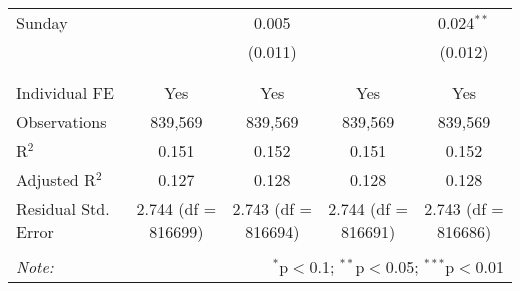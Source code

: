 \documentclass[
]{article}
\begin{document}
\begin{table}[!htbp]
{\begin{tabular}{@{\extracolsep{5pt}}lcccc}
 Sunday &  & 0.005 &  & 0.024$^{**}$ \\ 
  &  & (0.011) &  & (0.012) \\ 
  & & & & \\ 
\hline \\[-1.8ex] 
Individual FE & Yes & Yes & Yes & Yes \\ 
Observations & 839,569 & 839,569 & 839,569 & 839,569 \\ 
R$^{2}$ & 0.151 & 0.152 & 0.151 & 0.152 \\ 
Adjusted R$^{2}$ & 0.127 & 0.128 & 0.128 & 0.128 \\ 
Residual Std. Error & 2.744 (df = 816699) & 2.743 (df = 816694) & 2.744 (df = 816691) & 2.743 (df = 816686) \\ 
\hline 
\hline \\[-1.8ex] 
\textit{Note:}  & \multicolumn{4}{r}{$^{*}$p$<$0.1; $^{**}$p$<$0.05; $^{***}$p$<$0.01} \\ 
\end{tabular}
} 
\end{table}
\end{document}

